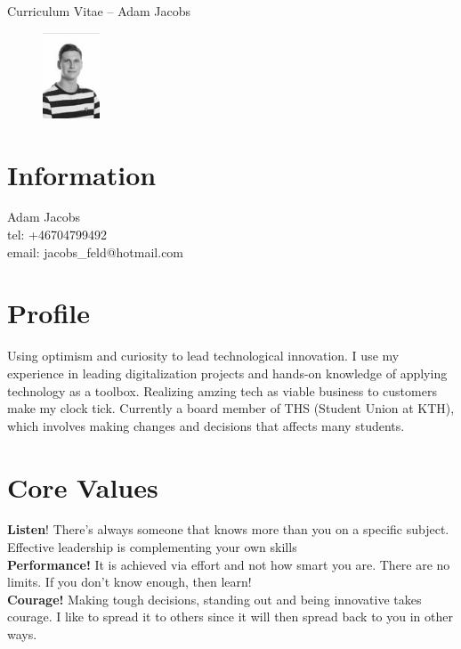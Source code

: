 \documentclass[margin,line,a4paper]{resume}
\begin{document}
{\sc \Large Curriculum Vitae -- Adam Jacobs}
\begin{resume}
    \vspace{0.01cm}
    \begin{figure}
        \vspace{-1cm}
       \begin{center}
       \includegraphics[width=0.15\textwidth]{adamjacobs}
       \end{center}
        \vspace{-1cm}
    \end{figure}
    
    \section{\mysidestyle Information}%
    Adam Jacobs \\
    tel: +46704799492 \\
    email: jacobs\_feld@hotmail.com
    \href{} \\

\section{\mysidestyle Profile}\vspace{1mm}
Using optimism and curiosity to lead technological innovation. I use my experience in leading digitalization projects and hands-on knowledge of applying technology as a toolbox. Realizing amzing tech as viable business to customers make my clock tick. Currently a board member of THS (Student Union at KTH), which involves making changes and decisions that affects many students.

\section{\mysidestyle Core Values}\vspace{1mm}
    \textbf{Listen}! There's always someone that knows more than you on a specific subject. Effective leadership is complementing your own skills
    \\
     \textbf{Performance!} It is achieved via effort and not how smart you are. There are no limits. If you don't know enough, then learn!
    \\
    \textbf{Courage!} Making tough decisions, standing out and being innovative takes courage. I like to spread it to others since it will then spread back to you in other ways. 


\end{resume}
\end{document}
